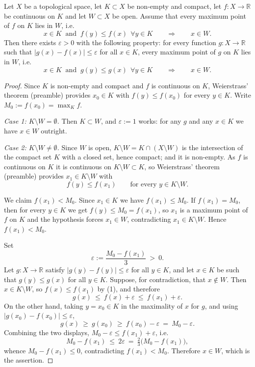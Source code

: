 \begin{lemma}
Let $X$ be a topological space, let $K\subset X$ be non-empty and compact, let
$f:X\to\mathbb{R}$ be continuous on $K$ and let $W\subset X$ be open. Assume that every maximum
point of $f$ on $K$ lies in $W$, i.e.
$$x\in K\ \text{ and }\ f(y)\leq f(x)\ \ \forall y\in K\qquad\Longrightarrow\qquad x\in W .$$
Then there exists $\varepsilon>0$ with the following property: for every function
$g:X\to\mathbb{R}$ such that $|g(x)-f(x)|\leq\varepsilon$ for all $x\in K$, every maximum point of
$g$ on $K$ lies in $W$, i.e.
$$x\in K\ \text{ and }\ g(y)\leq g(x)\ \ \forall y\in K\qquad\Longrightarrow\qquad x\in W .$$
\end{lemma}
\begin{proof}
Since $K$ is non-empty and compact and $f$ is continuous on $K$, Weierstrass' theorem (preamble)
provides $x_0\in K$ with $f(y)\leq f(x_0)$ for every $y\in K$. Write $M_0:=f(x_0)=\max_Kf$.

\emph{Case 1: $K\setminus W=\emptyset$.} Then $K\subset W$, and $\varepsilon:=1$ works: for any
$g$ and any $x\in K$ we have $x\in W$ outright.

\emph{Case 2: $K\setminus W\neq\emptyset$.} Since $W$ is open, $K\setminus W=K\cap(X\setminus W)$
is the intersection of the compact set $K$ with a closed set, hence compact; and it is non-empty.
As $f$ is continuous on $K$ it is continuous on $K\setminus W\subset K$, so Weierstrass' theorem
(preamble) provides $x_1\in K\setminus W$ with
\begin{equation*}f(y)\leq f(x_1)\qquad\text{for every }y\in K\setminus W. \tag{1}\end{equation*}

We claim $f(x_1)<M_0$. Since $x_1\in K$ we have $f(x_1)\leq M_0$. If $f(x_1)=M_0$, then for every
$y\in K$ we get $f(y)\leq M_0=f(x_1)$, so $x_1$ is a maximum point of $f$ on $K$ and the hypothesis
forces $x_1\in W$, contradicting $x_1\in K\setminus W$. Hence $f(x_1)<M_0$.

Set
$$\varepsilon:=\frac{M_0-f(x_1)}{3}\ >\ 0 .$$
Let $g:X\to\mathbb{R}$ satisfy $|g(y)-f(y)|\leq\varepsilon$ for all $y\in K$, and let $x\in K$ be
such that $g(y)\leq g(x)$ for all $y\in K$. Suppose, for contradiction, that $x\notin W$. Then
$x\in K\setminus W$, so $f(x)\leq f(x_1)$ by (1), and therefore
$$g(x)\ \leq\ f(x)+\varepsilon\ \leq\ f(x_1)+\varepsilon .$$
On the other hand, taking $y=x_0\in K$ in the maximality of $x$ for $g$, and using
$|g(x_0)-f(x_0)|\leq\varepsilon$,
$$g(x)\ \geq\ g(x_0)\ \geq\ f(x_0)-\varepsilon\ =\ M_0-\varepsilon .$$
Combining the two displays, $M_0-\varepsilon\leq f(x_1)+\varepsilon$, i.e.
$$M_0-f(x_1)\ \leq\ 2\varepsilon\ =\ \tfrac{2}{3}\big(M_0-f(x_1)\big),$$
whence $M_0-f(x_1)\leq0$, contradicting $f(x_1)<M_0$. Therefore $x\in W$, which is the assertion.
\end{proof}
